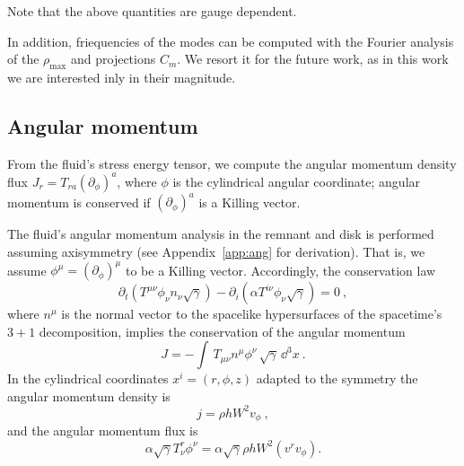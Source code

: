 
Note that the above quantities are gauge dependent.


In addition, friequencies of the modes can be computed with the Fourier analysis of the $\rho_{\text{max}}$ and projections $C_{m}$. We resort it for the future work, as in this work we are interested inly in their magnitude. 





\subsection{Angular momentum}



From the fluid's stress energy tensor,
we compute the angular momentum density flux $J_r = T_{ra}(\partial_\phi)^a$,
where $\phi$ is the cylindrical angular coordinate;
angular momentum is conserved if $(\partial_\phi)^a$ is a Killing vector.


The fluid's angular momentum analysis in the remnant and disk is performed
assuming axisymmetry (see Appendix~\ref{app:ang} for derivation).
That is, we assume $\phi^{\mu} = (\partial_{\phi})^{\mu}$ to be a Killing
vector. Accordingly, the conservation law
\begin{equation}
\partial_t(T^{\mu\nu}\phi_{\nu}n_{\nu}\sqrt{\gamma}) -
\partial_i(\alpha T^{i \nu}\phi_{\nu}\sqrt{\gamma}) = 0 \ ,
\end{equation}
where $n^\mu$ is the normal vector to the spacelike hypersurfaces of
the spacetime's $3+1$ decomposition, 
implies the conservation of the angular momentum
\begin{equation}
J = %
-\int \,
T_{\mu\nu}n^{\mu}\phi^{\nu}\,\sqrt{\gamma}\, \dd^3 x\ .
\end{equation}
In the cylindrical coordinates $x^i=(r,\phi,z)$ adapted to the symmetry
the angular momentum density is  
\begin{equation}
j = %
\rho h W^2 v_{\phi} \ ,
\label{eq:method:ang_mom}
\end{equation}
and the angular momentum flux is 
\begin{equation}
\alpha\sqrt{\gamma}T^r _{\nu}\phi^{\nu} =
\alpha\sqrt{\gamma}\rho h W^2 (v^{r}v_{\phi}) .
\end{equation}



